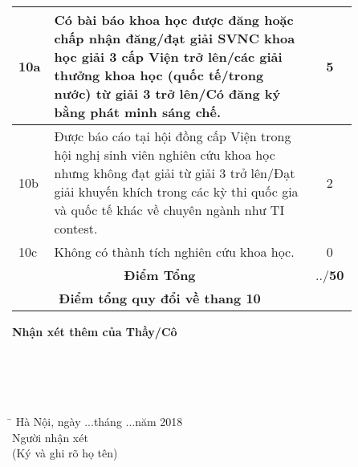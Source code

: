 \begin{longtable}{| m{0.035\linewidth} | m{0.7\linewidth} | m{0.02\linewidth} | m{0.02\linewidth}| m{0.02\linewidth}|  m{0.02\linewidth} | m{0.02\linewidth} |}
	10a & Có bài báo khoa học được đăng hoặc chấp nhận đăng/đạt giải SVNC khoa học giải 3 cấp Viện trở lên/các giải thưởng khoa học (quốc tế/trong nước) từ giải 3 trở lên/Có đăng ký bằng phát minh sáng chế. & \multicolumn{5}{c|}{5} \\ \hline
    10b & Được báo cáo tại hội đồng cấp Viện trong hội nghị sinh viên nghiên cứu khoa học nhưng không đạt giải từ giải 3 trở lên/Đạt giải khuyến khích trong các kỳ thi quốc gia và quốc tế khác về chuyên ngành như TI contest. & \multicolumn{5}{c|}{2} \\ \hline 
    10c & Không có thành tích nghiên cứu khoa học. & \multicolumn{5}{c|}{0} \\ \hline 
    \multicolumn{2}{|c|}{\textbf{Điểm Tổng}} & \multicolumn{5}{c|}{../\textbf{50}} \\ \hline
    \multicolumn{2}{|c|}{\textbf{Điểm tổng quy đổi về thang 10 }} & \multicolumn{5}{c|}{} \\ \hline
	\end{longtable}    
\thispagestyle{plain}

\noindent\textbf{Nhận xét thêm của Thầy/Cô} \\
\dotline[4pt]{\linewidth} \\
 \dotline[4pt]{\linewidth}\\
  \dotline[4pt]{\linewidth} \\
   \dotline[4pt]{\linewidth} \\
    \dotline[4pt]{\linewidth}
 
 \begin{tabbing}
 \hspace{9cm}\=\kill
   \> Hà Nội, ngày ...tháng ...năm 2018 \\ 
   \>  \hspace{1.5cm}    Người nhận xét\\ 
   \>   \hspace{1cm}  (Ký và ghi rõ họ tên)		
 \end{tabbing} 

